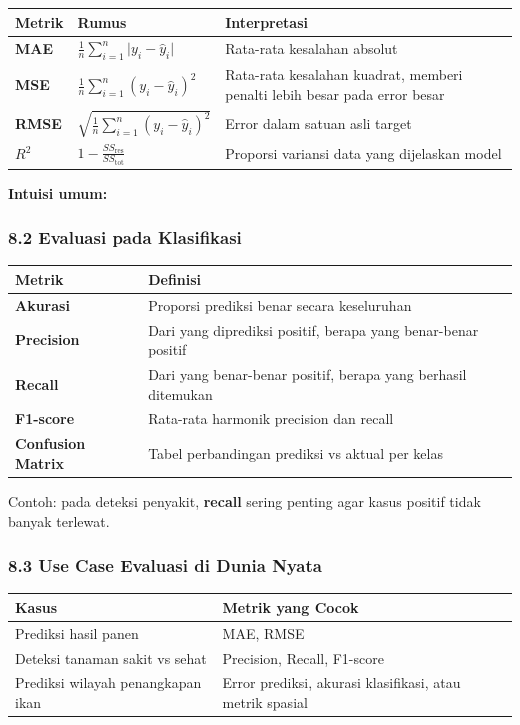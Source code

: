 \documentclass[12pt,a4paper]{article}
\begin{document}
\begin{tabular}{|l|l|l|}
\hline
Metrik & Rumus & Interpretasi \\
\hline
\textbf{MAE} & $\frac{1}{n} \sum_{i=1}^{n} \lvert y_i - \hat{y}_i \rvert$ & Rata-rata kesalahan absolut \\
\hline
\textbf{MSE} & $\frac{1}{n} \sum_{i=1}^{n} (y_i - \hat{y}_i)^2$ & Rata-rata kesalahan kuadrat, memberi penalti lebih besar pada error besar \\
\hline
\textbf{RMSE} & $\sqrt{\frac{1}{n} \sum_{i=1}^{n} (y_i - \hat{y}_i)^2}$ & Error dalam satuan asli target \\
\hline
\textbf{$R^2$} & $1 - \frac{SS_{\text{res}}}{SS_{\text{tot}}}$ & Proporsi variansi data yang dijelaskan model \\
\hline
\end{tabular}


\textbf{Intuisi umum:}


\subsubsection{8.2 Evaluasi pada Klasifikasi}

\begin{tabular}{|l|l|}
\hline
Metrik & Definisi \\
\hline
\textbf{Akurasi} & Proporsi prediksi benar secara keseluruhan \\
\hline
\textbf{Precision} & Dari yang diprediksi positif, berapa yang benar-benar positif \\
\hline
\textbf{Recall} & Dari yang benar-benar positif, berapa yang berhasil ditemukan \\
\hline
\textbf{F1-score} & Rata-rata harmonik precision dan recall \\
\hline
\textbf{Confusion Matrix} & Tabel perbandingan prediksi vs aktual per kelas \\
\hline
\end{tabular}


Contoh: pada deteksi penyakit, \textbf{recall} sering penting agar kasus positif tidak banyak terlewat.


\subsubsection{8.3 Use Case Evaluasi di Dunia Nyata}

\begin{tabular}{|l|l|}
\hline
Kasus & Metrik yang Cocok \\
\hline
Prediksi hasil panen & MAE, RMSE \\
\hline
Deteksi tanaman sakit vs sehat & Precision, Recall, F1-score \\
\hline
Prediksi wilayah penangkapan ikan & Error prediksi, akurasi klasifikasi, atau metrik spasial \\
\hline
\end{tabular}
\end{document}
